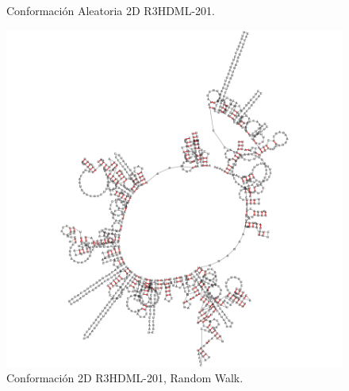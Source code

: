 \documentclass[a4paper,11pt,titlepage]{article}
\theoremstyle{definition}
\begin{document}
\begin{figure}[H]
\begin{minipage}[c]{0.31\textwidth}
        \caption{Conformación Aleatoria 2D R3HDML-201.}
        \label{fig:R3HDML-201-rndc}
    \end{minipage}
    \hfill
    \begin{minipage}[c]{0.31\textwidth}
        \centering
        \includegraphics[width=\textwidth]{images/R3HDML-201-db_one_conf.png}
        \caption{Conformación 2D R3HDML-201, Random Walk.}
        \label{fig:R3HDML-201-rndw}
    \end{minipage}
\end{figure}



\end{document}
